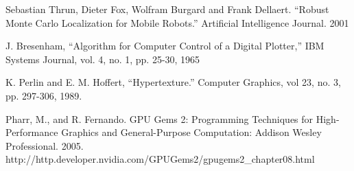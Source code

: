 \documentclass[letterpaper, 10 pt, conference]{ieeeconf}  %
\begin{document}
\begin{thebibliography}{99}

 Sebastian Thrun, Dieter Fox, Wolfram Burgard and Frank Dellaert. “Robust Monte Carlo Localization for Mobile Robots.” Artificial Intelligence Journal. 2001

 J. Bresenham, “Algorithm for Computer Control of a Digital Plotter,” IBM Systems Journal, vol. 4, no. 1, pp. 25-30, 1965

 K. Perlin and E. M. Hoffert, “Hypertexture.” Computer Graphics, vol 23, no. 3, pp. 297-306, 1989.

 Pharr, M., and R. Fernando. GPU Gems 2: Programming Techniques for High-Performance Graphics and General-Purpose Computation: Addison Wesley Professional. 2005. http://http.developer.nvidia.com/GPUGems2/gpugems2\_chapter08.html

\end{thebibliography}
\end{document}
